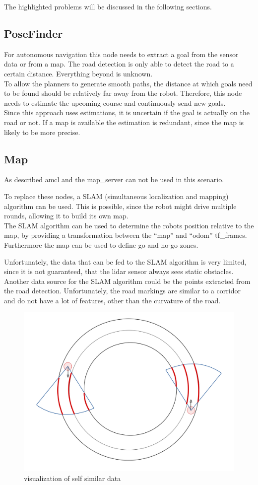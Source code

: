The highlighted problems will be discussed in the following sections.



\subsection{PoseFinder}
For autonomous navigation this node needs to extract a goal from the sensor data or from a map.
The road detection is only able to detect the road to a certain distance. Everything beyond is unknown.\\
To allow the planners to generate smooth paths, the distance at which goals need to be found should be relatively far away from the robot. Therefore, this node needs to estimate the upcoming course and continuously send new goals.\\

Since this approach uses estimations, it is uncertain if the goal is actually on the road or not. If a map is available the estimation is redundant, since the map is likely to be more precise.

\subsection{Map}
As described amcl and the map\_server can not be used in this scenario.

To replace these nodes, a SLAM (simultaneous localization and mapping) algorithm can be used.
This is possible, since the robot might drive multiple rounds, allowing it to build its own map.\\

The SLAM algorithm can be used to determine the robots position relative to the map, by providing a transformation between the ``map'' and ``odom'' tf\_frames. Furthermore the map can be used to define go and no-go zones.

Unfortunately, the data that can be fed to the SLAM algorithm is very limited, since it is not guaranteed, that the lidar sensor always sees static obstacles. Another data source for the SLAM algorithm could be the points extracted from the road detection. Unfortunately, the road markings are similar to a corridor and do not have a lot of features, other than the curvature of the road.\\

\begin{figure}[H]
	\centering
	\includegraphics[width=.5\textwidth]{Pictures/selfsimillar}
	\caption{visualization of self similar data}
	\label{selfsimilar}
\end{figure}

